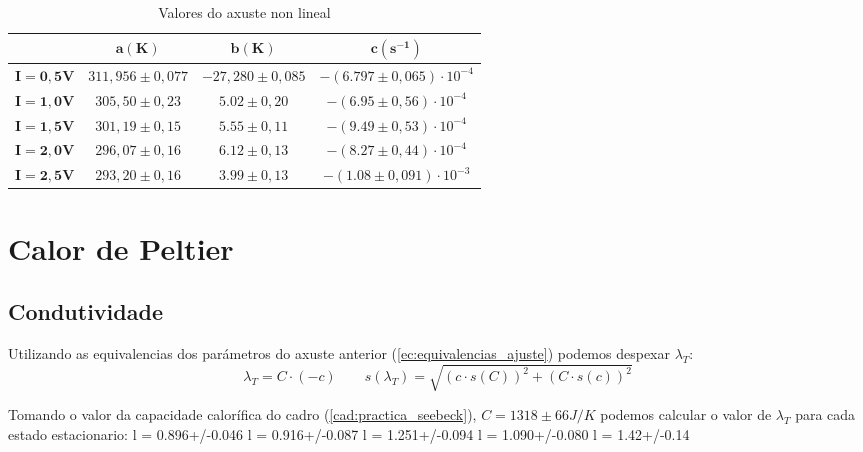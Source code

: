 \documentclass[12pt, a4paper, titlepage]{article}
\begin{document}
  \begin{table}[H]
    \centering
    \begin{tabular}{c|c|c|c|}
    \cline{2-4}
                                              & $\mathbf{a(K)}$               & $\mathbf{b(K)}$               & $\mathbf{c(s^{-1})}$   \\ \hline
    \multicolumn{1}{|c|}{$\mathbf{I = 0,5V}$} & $311,956 \pm 0,077$ & $-27,280 \pm 0,085$ & $-(6.797 \pm 0,065) \cdot 10^{-4}$ \\ \hline
    \multicolumn{1}{|c|}{$\mathbf{I = 1,0V}$} & $305,50 \pm 0,23$ & $5.02 \pm 0,20$ & $-(6.95 \pm 0,56) \cdot 10^{-4}$ \\ \hline
    \multicolumn{1}{|c|}{$\mathbf{I = 1,5V}$} & $301,19 \pm 0,15$ & $5.55 \pm 0,11$ & $-(9.49 \pm 0,53) \cdot 10^{-4}$ \\ \hline
    \multicolumn{1}{|c|}{$\mathbf{I = 2,0V}$} & $296,07 \pm 0,16$ & $6.12 \pm 0,13$ & $-(8.27 \pm 0,44) \cdot 10^{-4}$ \\ \hline
    \multicolumn{1}{|c|}{$\mathbf{I = 2,5V}$} & $293,20 \pm 0,16$ & $3.99 \pm 0,13$ & $-(1.08 \pm 0,091) \cdot 10^{-3}$ \\ \hline
    \end{tabular}
    \caption{Valores do axuste non lineal}
    \label{cad:valores_axuste}
  \end{table}

  \section{Calor de Peltier}

  \subsection{Condutividade}

  Utilizando as equivalencias dos parámetros do axuste anterior (\ref{ec:equivalencias_ajuste}) podemos despexar $\lambda_T$:
  \begin{equation}
    \lambda_T = C \cdot (-c) \qquad s(\lambda_T) = \sqrt{(c \cdot s(C))^2 + (C \cdot s(c))^2}
    \label{ec:lambda_T}
  \end{equation}

  Tomando o valor da capacidade calorífica do cadro (\ref{cad:practica_seebeck}), $C = 1318 \pm 66 J/K$ podemos calcular o valor de $\lambda_T$ para cada estado estacionario:
  l = 0.896+/-0.046
  l = 0.916+/-0.087
  l = 1.251+/-0.094
  l = 1.090+/-0.080
  l = 1.42+/-0.14
\end{document}

